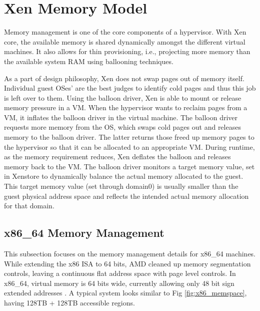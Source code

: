 \section{Xen Memory Model}

Memory management is one of the core components of a hypervisor. With Xen core, the available memory is shared dynamically amongst the different virtual machines. It also allows for thin provisioning, i.e., projecting more memory than the available system RAM using ballooning techniques.

As a part of design philosophy, Xen does not swap pages out of memory itself. Individual guest OSes’ are the best judges to identify cold pages and thus this job is left over to them. Using the balloon driver, Xen is able to mount or release memory pressure in a VM. When the hypervisor wants to reclaim pages from a VM, it inflates the balloon driver in the virtual machine. The balloon driver requests more memory from the OS, which swaps cold pages out and releases memory to the balloon driver. The latter returns those freed up memory pages to the hypervisor so that it can be allocated to an appropriate VM. During runtime, as the memory requirement reduces, Xen deflates the balloon and releases memory back to the VM. The balloon driver monitors a target memory value, set in Xenstore to dynamically balance the actual memory allocated to the guest. This target memory value (set through domain0) is usually smaller than the guest physical address space and reflects the intended actual memory allocation for that domain. 
 

\subsection{x86\_64 Memory Management}
This subsection focuses on the memory management details for x86\_64 machines. While extending the x86 ISA to 64 bits, AMD cleaned up memory segmentation controls, leaving a continuous flat address space with page level controls. In x86\_64, virtual memory is 64 bits wide, currently allowing only 48 bit sign extended addresses \cite{intel_manual}. A typical system looks similar to Fig \ref{fig:x86_memspace}, having 128TB + 128TB accessible regions. 

